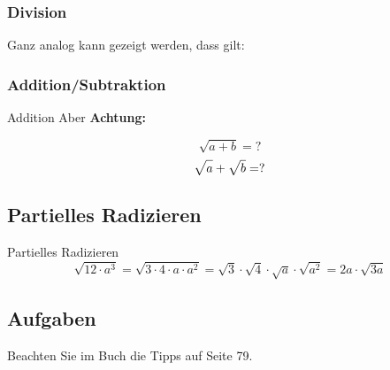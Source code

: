 \subsubsection{Division}
Ganz analog kann gezeigt werden, dass gilt: 


\subsubsection{Addition/Subtraktion}
\begin{bemerkung}{Addition}{}
  Aber \textbf{Achtung:}
  
$$\sqrt{a+b} = ?$$
  $$\sqrt{a\mathstrut{}} + \sqrt{b\mathstrut{}} = ?$$
\end{bemerkung}

\newpage

\subsection{Partielles Radizieren}

\begin{beispiel}{Partielles
Radizieren}{}
$$\sqrt{12\cdot{} a^3} = \sqrt{3\cdot{} 4 \cdot{} a \cdot{} a^2}
= \sqrt{3} \cdot{} \sqrt{4} \cdot{} \sqrt{a} \cdot{} \sqrt{a^2} = 2a\cdot{}\sqrt{3a}$$
\end{beispiel}

\subsection*{Aufgaben}

Beachten Sie im Buch die Tipps auf Seite 79.

\newpage
